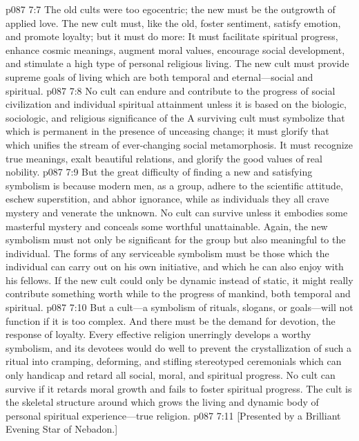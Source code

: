 \vs p087 7:7 The old cults were too egocentric; the new must be the outgrowth of applied love. The new cult must, like the old, foster sentiment, satisfy emotion, and promote loyalty; but it must do more: It must facilitate spiritual progress, enhance cosmic meanings, augment moral values, encourage social development, and stimulate a high type of personal religious living. The new cult must provide supreme goals of living which are both temporal and eternal---social and spiritual.
\vs p087 7:8 No cult can endure and contribute to the progress of social civilization and individual spiritual attainment unless it is based on the biologic, sociologic, and religious significance of the  A surviving cult must symbolize that which is permanent in the presence of unceasing change; it must glorify that which unifies the stream of ever\hyp{}changing social metamorphosis. It must recognize true meanings, exalt beautiful relations, and glorify the good values of real nobility.
\vs p087 7:9 But the great difficulty of finding a new and satisfying symbolism is because modern men, as a group, adhere to the scientific attitude, eschew superstition, and abhor ignorance, while as individuals they all crave mystery and venerate the unknown. No cult can survive unless it embodies some masterful mystery and conceals some worthful unattainable. Again, the new symbolism must not only be significant for the group but also meaningful to the individual. The forms of any serviceable symbolism must be those which the individual can carry out on his own initiative, and which he can also enjoy with his fellows. If the new cult could only be dynamic instead of static, it might really contribute something worth while to the progress of mankind, both temporal and spiritual.\plusone
\vs p087 7:10 But a cult---a symbolism of rituals, slogans, or goals---will not function if it is too complex. And there must be the demand for devotion, the response of loyalty. Every effective religion unerringly develops a worthy symbolism, and its devotees would do well to prevent the crystallization of such a ritual into cramping, deforming, and stifling stereotyped ceremonials which can only handicap and retard all social, moral, and spiritual progress. No cult can survive if it retards moral growth and fails to foster spiritual progress. The cult is the skeletal structure around which grows the living and dynamic body of personal spiritual experience---true religion.
\vsetoff
\vs p087 7:11 [Presented by a Brilliant Evening Star of Nebadon.]
